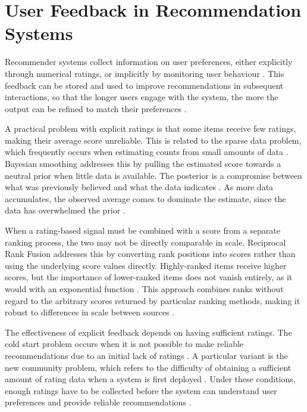 \section{User Feedback in Recommendation Systems}

Recommender systems collect information on user preferences, 
either explicitly through numerical ratings, or implicitly 
by monitoring user behaviour 
\parencite[Chapter~3.1]{bobadilla2013recommender_systems_survey}. 
This feedback can be stored and used to improve recommendations 
in subsequent interactions, so that the longer users engage 
with the system, the more the output can be refined to match 
their preferences 
\parencite[Chapter~1]{ricci2010recommender_systems_handbook}.

A practical problem with explicit ratings is that some items 
receive few ratings, making their average score unreliable. 
This is related to the sparse data problem, which frequently 
occurs when estimating counts from small amounts of data 
\parencite[Chapter~3.3]{murphy2012machine_learning_probabilistic_perspective}. 
Bayesian smoothing addresses this by pulling the estimated score 
towards a neutral prior when little data is available. 
The posterior is a compromise between what was previously 
believed and what the data indicates 
\parencite[Chapter~3.3]{murphy2012machine_learning_probabilistic_perspective}. 
As more data accumulates, the observed average comes to dominate 
the estimate, since the data has overwhelmed the prior 
\parencite[Chapter~3.3]{murphy2012machine_learning_probabilistic_perspective}.

When a rating-based signal must be combined with a score from 
a separate ranking process, the two may not be directly 
comparable in scale. Reciprocal Rank Fusion addresses this by 
converting rank positions into scores rather than using the 
underlying score values directly. Highly-ranked items receive 
higher scores, but the importance of lower-ranked items does 
not vanish entirely, as it would with an exponential function 
\parencite{cormack2009reciprocal_rank_fusion}. 
This approach combines ranks without regard to the arbitrary 
scores returned by particular ranking methods, making it 
robust to differences in scale between sources 
\parencite{cormack2009reciprocal_rank_fusion}.

The effectiveness of explicit feedback depends on having 
sufficient ratings. The cold start problem occurs when it is 
not possible to make reliable recommendations due to an 
initial lack of ratings 
\parencite[Chapter~3.2]{bobadilla2013recommender_systems_survey}. 
A particular variant is the new community problem, which refers 
to the difficulty of obtaining a sufficient amount of rating 
data when a system is first deployed 
\parencite[Chapter~3.2]{bobadilla2013recommender_systems_survey}. 
Under these conditions, enough ratings have to be collected 
before the system can understand user preferences and provide 
reliable recommendations 
\parencite[Chapter~3]{ricci2010recommender_systems_handbook}.